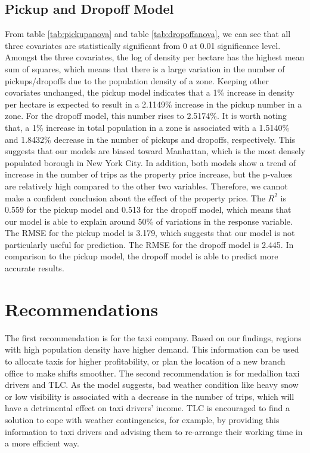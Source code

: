 \documentclass[11pt]{article}
\begin{document}
\subsection{Pickup and Dropoff Model}
From table \ref{tab:pickupanova} and table \ref{tab:dropoffanova}, we can see that all three covariates are statistically significant from 0 at 0.01 significance level. Amongst the three covariates, the log of density per hectare has the highest mean sum of squares, which means that there is a large variation in the number of pickups/dropoffs due to the population density of a zone. Keeping other covariates unchanged, the pickup model indicates that a 1\% increase in density per hectare is expected to result in a 2.1149\% increase in the pickup number in a zone. For the dropoff model, this number rises to 2.5174\%. It is worth noting that, a 1\% increase in total population in a zone is associated with a 1.5140\% and 1.8432\% decrease in the number of pickups and dropoffs, respectively. This suggests that our models are biased toward Manhattan, which is the most densely populated borough in New York City. In addition, both models show a trend of increase in the number of trips as the property price increase, but the p-values are relatively high compared to the other two variables. Therefore, we cannot make a confident conclusion about the effect of the property price. The $R^2$ is 0.559 for the pickup model and 0.513 for the dropoff model, which means that our model is able to explain around 50\% of variations in the response variable. The RMSE for the pickup model is 3.179, which suggests that our model is not particularly useful for prediction. The RMSE for the dropoff model is 2.445. In comparison to the pickup model, the dropoff model is able to predict more accurate results.

\section{Recommendations}
The first recommendation is for the taxi company. Based on our findings, regions with high population density have higher demand. This information can be used to allocate taxis for higher profitability, or plan the location of a new branch office to make shifts smoother. The second recommendation is for medallion taxi drivers and TLC. As the model suggests, bad weather condition like heavy snow or low visibility is associated with a decrease in the number of trips, which will have a detrimental effect on taxi drivers' income. TLC is encouraged to find a solution to cope with weather contingencies, for example, by providing this information to taxi drivers and advising them to re-arrange their working time in a more efficient way.
\end{document}
